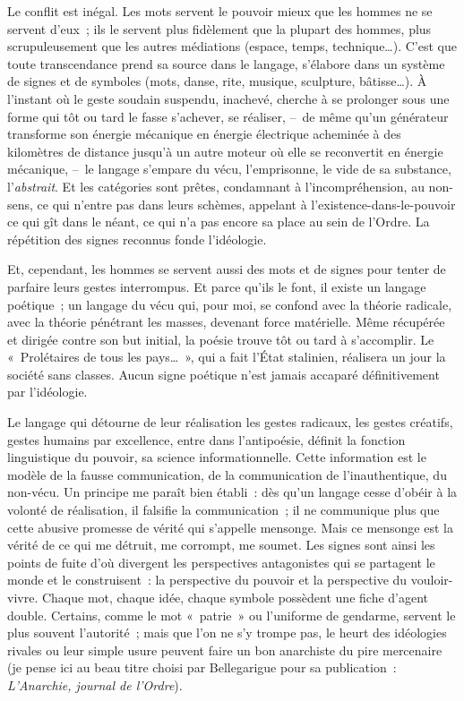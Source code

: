 \documentclass[french,twoside]{book} %
\newcommand{\astermono}{\medskip\centerline{\color{rubric}\large\selectfont{\syms ✻}}\medskip\par}%
\begin{document}
\astermono

\noindent Le conflit est inégal. Les mots servent le pouvoir mieux que les hommes ne se servent d’eux ; ils le servent plus fidèlement que la plupart des hommes, plus scrupuleusement que les autres médiations (espace, temps, technique…). C’est que toute transcendance prend sa source dans le langage, s’élabore dans un système de signes et de symboles (mots, danse, rite, musique, sculpture, bâtisse…). À l’instant où le geste soudain suspendu, inachevé, cherche à se prolonger sous une forme qui tôt ou tard le fasse s’achever, se réaliser, – de même qu’un générateur transforme son énergie mécanique en énergie électrique acheminée à des kilomètres de distance jusqu’à un autre moteur où elle se reconvertit en énergie mécanique, – le langage s’empare du vécu, l’emprisonne, le vide de sa substance, l’\emph{abstrait}. Et les catégories sont prêtes, condamnant à l’incompréhension, au non-sens, ce qui n’entre pas dans leurs schèmes, appelant à l’existence-dans-le-pouvoir ce qui gît dans le néant, ce qui n’a pas encore sa place au sein de l’Ordre. La répétition des signes reconnus fonde l’idéologie.\par
Et, cependant, les hommes se servent aussi des mots et de signes pour tenter de parfaire leurs gestes interrompus. Et parce qu’ils le font, il existe un langage poétique ; un langage du vécu qui, pour moi, se confond avec la théorie radicale, avec la théorie pénétrant les masses, devenant force matérielle. Même récupérée et dirigée contre son but initial, la poésie trouve tôt ou tard à s’accomplir. Le « Prolétaires de tous les pays… », qui a fait l’État stalinien, réalisera un jour la société sans classes. Aucun signe poétique n’est jamais accaparé définitivement par l’idéologie.\par
Le langage qui détourne de leur réalisation les gestes radicaux, les gestes créatifs, gestes humains par excellence, entre dans l’antipoésie, définit la fonction linguistique du pouvoir, sa science informationnelle. Cette information est le modèle de la fausse communication, de la communication de l’inauthentique, du non-vécu. Un principe me paraît bien établi : dès qu’un langage cesse d’obéir à la volonté de réalisation, il falsifie la communication ; il ne communique plus que cette abusive promesse de vérité qui s’appelle mensonge. Mais ce mensonge est la vérité de ce qui me détruit, me corrompt, me soumet. Les signes sont ainsi les points de fuite d’où divergent les perspectives antagonistes qui se partagent le monde et le construisent : la perspective du pouvoir et la perspective du vouloir-vivre. Chaque mot, chaque idée, chaque symbole possèdent une fiche d’agent double. Certains, comme le mot « patrie » ou l’uniforme de gendarme, servent le plus souvent l’autorité ; mais que l’on ne s’y trompe pas, le heurt des idéologies rivales ou leur simple usure peuvent faire un bon anarchiste du pire mercenaire (je pense ici au beau titre choisi par Bellegarigue pour sa publication : \emph{L’Anarchie, journal de l’Ordre}).\par
\end{document}
